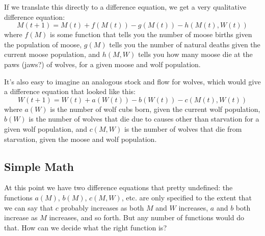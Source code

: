 If we translate this directly to a difference equation, we get a very qualitative difference equation:
$$M(t+1) = M(t) + f(M(t)) - g(M(t)) - h(M(t),W(t))$$
where $f(M)$ is some function that tells you the number of moose births given the population of moose, $g(M)$ tells you the number of natural deaths given the current moose population, and $h(M,W)$ tells you how many moose die at the paws (jaws?) of wolves, for a given moose and wolf population.

It's also easy to imagine an analogous stock and flow for wolves, which would give a difference equation that looked like this:
$$W(t+1) = W(t) + a(W(t)) - b(W(t)) - c(M(t), W(t))$$
where $a(W)$ is the number of wolf cubs born, given the current wolf population, $b(W)$ is the number of wolves that die due to causes other than starvation for a given wolf population, and $c(M,W)$ is the number of wolves that die from starvation, given the moose and wolf population.

\subsection{Simple Math}

At this point we have two difference equations that pretty undefined:  the functions $a(M)$, $b(M)$, $c(M,W)$, etc. are only specified to the extent that we can say that $c$ probably increases as both $M$ and $W$ increases, $a$ and $b$ both increase as $M$ increases, and so forth.  But any number of functions would do that.  How can we decide what the right function is?

